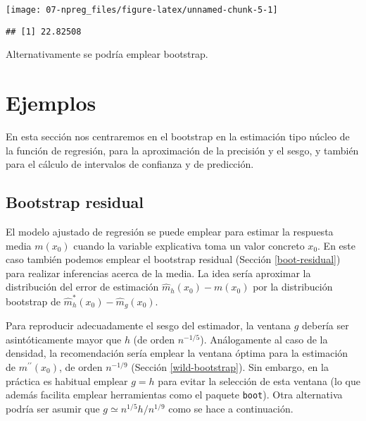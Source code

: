 \documentclass[
]{book}
\newenvironment{Shaded}{\begin{snugshade}}{\end{snugshade}}
\newcommand{\NormalTok}[1]{#1}
\newcommand{\SpecialCharTok}[1]{\textcolor[rgb]{0.00,0.00,0.00}{#1}}
\theoremstyle{break}
\theoremstyle{definition}
\theoremstyle{definition}
\theoremstyle{definition}
\theoremstyle{definition}
\theoremstyle{remark}
\begin{document}
\begin{center}\texttt{[image: 07-npreg\_files/figure-latex/unnamed-chunk-5-1]} \end{center}

\begin{Shaded}
\end{Shaded}

\begin{verbatim}
## [1] 22.82508
\end{verbatim}

Alternativamente se podría emplear bootstrap.

\hypertarget{ejemplos-2}{%
\section{Ejemplos}\label{ejemplos-2}}

En esta sección nos centraremos en el bootstrap en la estimación tipo núcleo de la función de regresión, para la aproximación de la precisión y el sesgo, y también para el cálculo de intervalos de confianza y de predicción.

\hypertarget{bootstrap-residual}{%
\subsection{Bootstrap residual}\label{bootstrap-residual}}

El modelo ajustado de regresión se puede emplear para estimar la respuesta media \(m(x_0)\) cuando la variable explicativa toma un valor concreto \(x_0\).
En este caso también podemos emplear el bootstrap residual (Sección \ref{boot-residual}) para realizar inferencias acerca de la media.
La idea sería aproximar la distribución del error de estimación \(\hat{m}_h(x_0) - m(x_0)\) por la distribución bootstrap de \(\hat{m}^{\ast}_h(x_0) - \hat{m}_g(x_0)\).

Para reproducir adecuadamente el sesgo del estimador, la ventana \(g\) debería ser asintóticamente mayor que \(h\) (de orden \(n^{-1/5}\)).
Análogamente al caso de la densidad, la recomendación sería emplear la ventana óptima para la estimación de \(m^{\prime \prime }\left( x_0 \right)\), de orden \(n^{-1/9}\) (Sección \ref{wild-bootstrap}).
Sin embargo, en la práctica es habitual emplear \(g=h\) para evitar la selección de esta ventana (lo que además facilita emplear herramientas como el paquete \texttt{boot}).
Otra alternativa podría ser asumir que \(g \simeq n^{1/5}h/n^{1/9}\) como se hace a continuación.
\end{document}
